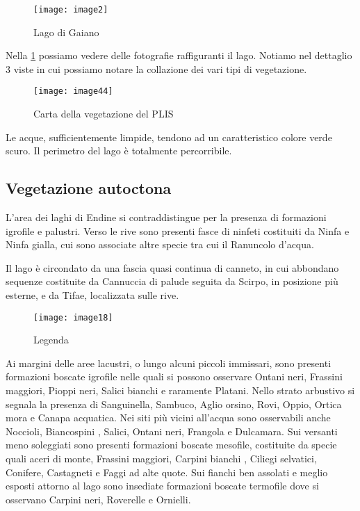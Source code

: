 \begin{figure}[H]
	\centering
	\texttt{[image: image2]}
	\caption{Lago di Gaiano}
	\label{fig:fotolago}
\end{figure}




Nella \cref{fig:fotolago} possiamo vedere delle fotografie raffiguranti il lago. Notiamo nel dettaglio 3 viste in cui possiamo notare la collazione dei vari tipi di vegetazione.

\begin{wrapfigure}[9]{r}{0.5\textwidth}
	\centering
	\texttt{[image: image44]}
	\caption{Carta della vegetazione del PLIS}
\end{wrapfigure}

Le acque, sufficientemente limpide, tendono ad un caratteristico colore verde scuro. Il perimetro del lago è totalmente percorribile.

\subsection{Vegetazione autoctona}




L'area dei laghi di Endine si contraddistingue per la presenza di formazioni igrofile e palustri. Verso le rive sono presenti fasce di ninfeti costituiti da Ninfa e Ninfa gialla, cui sono associate altre specie tra cui il Ranuncolo d’acqua.



Il lago è circondato da una fascia quasi continua di canneto, in cui abbondano sequenze costituite da Cannuccia di palude seguita da Scirpo, in posizione più esterne, e da Tifae, localizzata sulle rive. 

\begin{wrapfigure}[20]{r}{0.5\textwidth}
	\centering
	\texttt{[image: image18]}
	\caption{Legenda}
\end{wrapfigure}

Ai margini delle aree lacustri, o lungo alcuni piccoli immissari, sono presenti formazioni boscate igrofile nelle quali si possono osservare Ontani neri, Frassini maggiori, Pioppi neri, Salici bianchi e raramente Platani. Nello strato arbustivo si segnala la presenza di Sanguinella, Sambuco, Aglio orsino, Rovi, Oppio, Ortica mora e Canapa acquatica.  Nei siti più vicini all'acqua sono osservabili anche Noccioli, Biancospini , Salici, Ontani neri, Frangola e Dulcamara. Sui versanti meno soleggiati sono presenti formazioni boscate mesofile, costituite da specie quali aceri di monte, Frassini maggiori, Carpini bianchi , Ciliegi selvatici, Conifere, Castagneti e Faggi ad alte quote.  Sui fianchi ben assolati e meglio esposti attorno al lago sono insediate formazioni boscate termofile dove si osservano Carpini neri, Roverelle e Ornielli.

\pagebreak